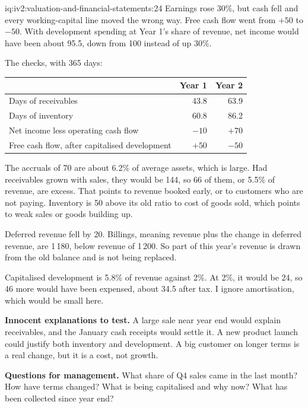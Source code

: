 \begin{solution}{iq:iv2:valuation-and-financial-statements:24}
Earnings rose 30\%, but cash fell and every working-capital line moved the wrong way. Free cash flow went from $+50$ to $-50$. With development spending at Year 1's share of revenue, net income would have been about 95.5, down from 100 instead of up 30\%.

The checks, with 365 days:
\begin{center}\small
\begin{tabular}{@{}lrr@{}}
 & Year 1 & Year 2 \\ \hline
Days of receivables & 43.8 & 63.9 \\
Days of inventory & 60.8 & 86.2 \\
Net income less operating cash flow & $-10$ & $+70$ \\
Free cash flow, after capitalised development & $+50$ & $-50$
\end{tabular}
\end{center}
The accruals of 70 are about 6.2\% of average assets, which is large. Had receivables grown with sales, they would be 144, so 66 of them, or 5.5\% of revenue, are excess. That points to revenue booked early, or to customers who are not paying. Inventory is 50 above its old ratio to cost of goods sold, which points to weak sales or goods building up.

Deferred revenue fell by 20. Billings, meaning revenue plus the change in deferred revenue, are 1\,180, below revenue of 1\,200. So part of this year's revenue is drawn from the old balance and is not being replaced.

Capitalised development is 5.8\% of revenue against 2\%. At 2\%, it would be 24, so 46 more would have been expensed, about 34.5 after tax. I ignore amortisation, which would be small here.

\textbf{Innocent explanations to test.} A large sale near year end would explain receivables, and the January cash receipts would settle it. A new product launch could justify both inventory and development. A big customer on longer terms is a real change, but it is a cost, not growth.

\textbf{Questions for management.} What share of Q4 sales came in the last month? How have terms changed? What is being capitalised and why now? What has been collected since year end?

\end{solution}

